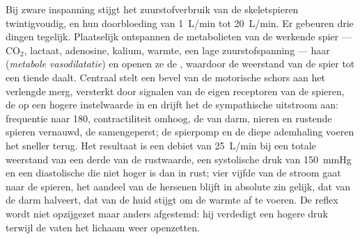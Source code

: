 \begin{proposition}[Inspanning]\label{prop:b2:blood-pressure:exercise}
Bij zware inspanning stijgt het zuurstofverbruik van de skeletspieren
twintigvoudig, en hun doorbloeding van \qty{1}{L/min} tot \qty{20}{L/min}.
Er gebeuren drie dingen tegelijk. Plaatselijk ontspannen de metabolieten van
de werkende spier --- $\mathrm{CO_2}$, lactaat, adenosine, kalium, warmte,
een lage zuurstofspanning --- haar  (\emph{metabole vasodilatatie})
en openen ze de , waardoor de weerstand van de spier tot een tiende
daalt. Centraal stelt een bevel van de motorische schors aan het verlengde
merg, versterkt door signalen van de eigen receptoren van de spieren, de
 op een hogere instelwaarde in en drijft het de sympathische
uitstroom aan: frequentie naar 180, contractiliteit omhoog, de  van
darm, nieren en rustende spieren vernauwd, de  samengeperst; de spierpomp
en de diepe ademhaling voeren het  sneller terug. Het resultaat is een
debiet van \qty{25}{L/min} bij een totale weerstand van een derde van de
rustwaarde, een systolische druk van \qty{150}{mmHg} en een diastolische die
niet hoger is dan in rust; vier vijfde van de stroom gaat naar de spieren,
het aandeel van de hersenen blijft in absolute zin gelijk, dat van de darm
halveert, dat van de huid stijgt om de warmte af te voeren. De reflex wordt
niet opzijgezet maar anders afgestemd: hij verdedigt een hogere druk terwijl
de vaten het lichaam weer openzetten.
\end{proposition}

